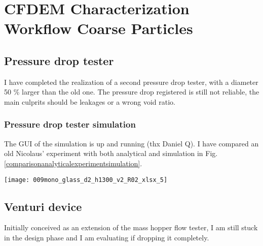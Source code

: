 
\section{CFDEM Characterization Workflow Coarse Particles}
\label{section:CFDemcharacterizationworkflowcoarseparticles}

\subsection{Pressure drop tester}
\label{subsection:pressuredroptester}

I have completed the realization of a second pressure drop tester, with a diameter 50 \% larger than the old one.
The pressure drop registered is still not reliable, the main culprits should be leakages or a wrong void ratio.\\

\subsubsection{Pressure drop tester simulation}
\label{subsubsection:pressuredroptestersimulation}

The GUI of the simulation is up and running (thx Daniel Q).
I have compared an old Nicolaus' experiment with both analytical and simulation in Fig. \ref{comparisonanalyticalexperimentsimulation}. \\

\begin{sidewaysfigure}
\texttt{[image: 009mono\_glass\_d2\_h1300\_v2\_R02\_xlsx\_5]}
\caption[pressure drop: exp-an-sim]{pressure drop: exp-an-sim: mono glass d2 h1300 v2 R02 xlsx 5}
\label{comparisonanalyticalexperimentsimulation}
\end{sidewaysfigure}

\subsection{Venturi device}
\label{subsection:venturidevice}

Initially conceived as an extension of the mass hopper flow tester, I am still stuck in the design phase and I am evaluating if dropping it completely.\\